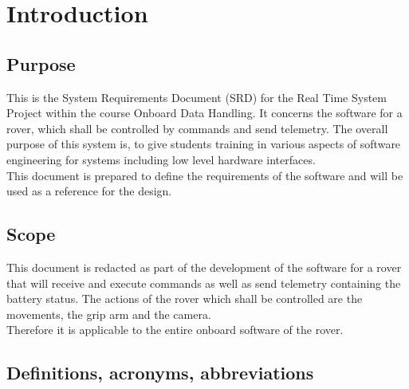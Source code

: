 \chapter{Introduction}
\label{cha:intro}
\section{Purpose}

This is the System Requirements Document (SRD) for the Real Time System Project within the course Onboard Data Handling. It concerns the software for a rover, which shall be controlled by commands and send telemetry. The overall purpose of this system is, to give students training in various aspects of software engineering for systems including low level hardware interfaces.\\

This document is prepared to define the requirements of the software and will be used as a reference for the design.

\section{Scope}

This document is redacted as part of the development of the software for a rover that will receive and execute commands as well as send telemetry containing the battery status. The actions of the rover which shall be controlled are the movements, the grip arm and the camera.\\

Therefore it is applicable to the entire onboard software of the rover.



\section{Definitions, acronyms, abbreviations}

